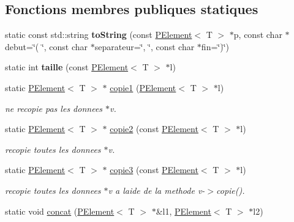 \subsection*{Fonctions membres publiques statiques}
\begin{DoxyCompactItemize}
\item 
\mbox{\label{class_p_element_adcb7faf10cd11d48fa2b5e91d247cd49}} 
static const std\+::string {\bfseries to\+String} (const \mbox{\hyperlink{class_p_element}{P\+Element}}$<$ T $>$ $\ast$p, const char $\ast$debut=\char`\"{}( \char`\"{}, const char $\ast$separateur=\char`\"{}, \char`\"{}, const char $\ast$fin=\char`\"{})\char`\"{})
\item 
\mbox{\label{class_p_element_a235499efd4e563d1fe59e4c804832d9c}} 
static int {\bfseries taille} (const \mbox{\hyperlink{class_p_element}{P\+Element}}$<$ T $>$ $\ast$l)
\item 
static \mbox{\hyperlink{class_p_element}{P\+Element}}$<$ T $>$ $\ast$ \mbox{\hyperlink{class_p_element_a37f4263271bae1cd966909f6aecc257d}{copie1}} (\mbox{\hyperlink{class_p_element}{P\+Element}}$<$ T $>$ $\ast$l)
\begin{DoxyCompactList}\small\item\em ne recopie pas les donnees $\ast$v. \end{DoxyCompactList}\item 
static \mbox{\hyperlink{class_p_element}{P\+Element}}$<$ T $>$ $\ast$ \mbox{\hyperlink{class_p_element_ace62f81f477d335fb2ff62d0992ebc6d}{copie2}} (const \mbox{\hyperlink{class_p_element}{P\+Element}}$<$ T $>$ $\ast$l)
\begin{DoxyCompactList}\small\item\em recopie toutes les donnees $\ast$v. \end{DoxyCompactList}\item 
static \mbox{\hyperlink{class_p_element}{P\+Element}}$<$ T $>$ $\ast$ \mbox{\hyperlink{class_p_element_afb475b1a17065198ee133b268f4cfc2a}{copie3}} (const \mbox{\hyperlink{class_p_element}{P\+Element}}$<$ T $>$ $\ast$l)
\begin{DoxyCompactList}\small\item\em recopie toutes les donnees $\ast$v a l\textquotesingle{}aide de la methode v-\/$>$copie(). \end{DoxyCompactList}\item 
static void \mbox{\hyperlink{class_p_element_ad481033d278200374e19cc3f2f8df0c7}{concat}} (\mbox{\hyperlink{class_p_element}{P\+Element}}$<$ T $>$ $\ast$\&l1, \mbox{\hyperlink{class_p_element}{P\+Element}}$<$ T $>$ $\ast$l2)

\end{DoxyCompactItemize}
